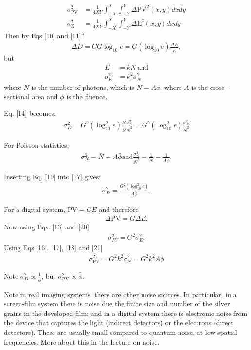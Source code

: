 \documentclass[mphy386-notes.tex]{subfiles}
\begin{document}
\begin{align}
  \sigma_{\text{PV}}^2 &= \frac{1}{4XY}\int_{-X}^{X}\int_{-Y}^{Y}\Delta \text{PV}^2(x,y)dxdy\\
    \sigma_{\text{E}}^2 &= \frac{1}{4XY}\int_{-X}^{X}\int_{-Y}^{Y}\Delta \text{E}^2(x,y)dxdy
\end{align}
Then by Eqs [10] and [11]''
\begin{align}
  \Delta D = CG\log_{10}e = G(\log_{10}e)\frac{\Delta E}{\bar{E}},
\end{align}
but
\begin{align}
  E &= kN \ \text{and}\\
  \sigma_E^2 &= k^2\sigma_N^2
\end{align}
where $N$ is the number of photons, which is $N = A\phi$, where $A$ is the
cross-sectional area and $\phi$ is the fluence.

Eq. [14] becomes:
\begin{align}
  \sigma_D^2 = G^2(\log_{10}^2 e ) \frac{k^2 \sigma_N^2}{k^2\bar{N}^2} = G^2(\log^2_{10}e)\frac{\sigma_N^2}{\bar{N}^2}
\end{align}

For Poisson statistics,
\begin{align}
  \sigma_N^2 = \bar{N} = A\bar{\phi} \text{and}
  \frac{\sigma^2_N}{\bar{N}^2} = \frac{1}{\bar{N}} = \frac{1}{A\bar{\phi}}. 
\end{align}

Inserting Eq. [19] into [17] gives:
\begin{align}
  \sigma_D^2 = \frac{G^2(\log^2_{10} e)}{A\bar{\phi}}.
\end{align}

For a digital system, $\text{PV} = GE$ and therefore
\begin{align}
  \Delta\text{PV} = G\Delta E. 
\end{align}
Now using Eqs. [13] and [20]
\begin{align}
  \sigma_{PV}^2 = G^2\sigma_E^2.
\end{align}
Using Eqs [16], [17], [18] and [21]
\begin{align}
  \sigma_{\text{PV}}^2 = G^2k^2\sigma_N^2 = G^2k^2A\bar{\phi}
\end{align}

Note $\sigma_D^2 \propto \frac{1}{\bar{\phi}}$, but $\sigma_{\text{PV}}^2 \propto \bar{\phi}$.

Note in real imaging systems, there are other noise sources. In particular, in
a screen-film system there is noise due the finite size and number of the silver
grains in the developed film; and in a digital system there is electronic noise
from the device that captures the light (indirect detectors) or the electrons
(direct detectors). These are usually small compared to quantum noise, at low
spatial frequencies. More about this in the lecture on noise.
\end{document}
